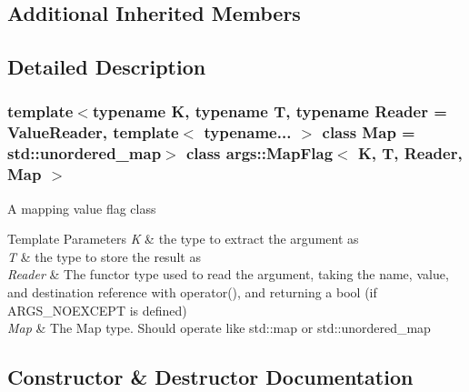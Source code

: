 \subsection*{Additional Inherited Members}


\subsection{Detailed Description}
\subsubsection*{template$<$typename K, typename T, typename Reader = Value\+Reader, template$<$ typename... $>$ class Map = std\+::unordered\+\_\+map$>$\newline
class args\+::\+Map\+Flag$<$ K, T, Reader, Map $>$}

A mapping value flag class


\begin{DoxyTemplParams}{Template Parameters}
{\em K} & the type to extract the argument as \\
\hline
{\em T} & the type to store the result as \\
\hline
{\em Reader} & The functor type used to read the argument, taking the name, value, and destination reference with operator(), and returning a bool (if A\+R\+G\+S\+\_\+\+N\+O\+E\+X\+C\+E\+PT is defined) \\
\hline
{\em Map} & The Map type. Should operate like std\+::map or std\+::unordered\+\_\+map \\
\hline
\end{DoxyTemplParams}


\subsection{Constructor \& Destructor Documentation}
\mbox{\label{classargs_1_1_map_flag_a36a375239e115d9923db2908330b4f75}} 
